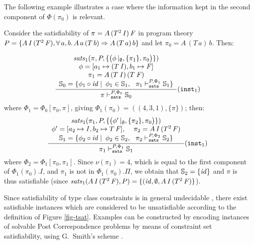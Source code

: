 The following example illustrates a case where the information kept in
the second component of $\Phi(\pi_0)$ is relevant.

\begin{Example}
\label{Paterson-condition-failure-example}
{\rm Consider the satisfiability of $\pi = A\,(T^2\,\text{\it I\/})\,\text{\it F\/}$ in
  program theory $P = \{ A\,\text{\it I\/}\,(T^2\,\text{\it F\/}), \forall\,a,b.\,A\,a\,(T\,b)
  \Rightarrow A\,(T\,a)\,b\}$ and let $\pi_0 = A\,(T\,a)\,b$. Then:}

\[
	\displaystyle\frac
		{\begin{array}{c}
            \textit{sats\/}_1(\pi,P,\{ \bigl( \phi\,|_\emptyset, \{ \pi_1 \}, \pi_0 \bigr) \}) \\
            \phi = [a_1\mapsto (T\,\text{\it I\/}), b_1 \mapsto \text{\it F\/}] \\ \pi_1 = A\,(T\:\text{\it I\/})\,(T\:\text{\it F\/})\\
            \mathbb{S}_0 = \{ \phi_1\circ {\it id\/} \mid \: \phi_1 \in \mathbb{S}_1,\:\:\:
                                                \pi_1 \vdash_{\texttt{sats}}^{P,\Phi_1} \mathbb{S}_1\}
         \end{array}}
		{\pi \vdash_{\texttt{sats}}^{P,\Phi_0} \mathbb{S}_0} ({\text{\tt inst}}_1)
\]
{\rm where $\Phi_1 = \Phi_0[\pi_0,\pi]$, giving $\Phi_1(\pi_0) = ((4,3,1), \{ \pi \})$; then:
\[
	\displaystyle\frac
		{\begin{array}{c}
            \textit{sats\/}_1(\pi_1,P,\{ \bigl( \phi'\,|_\emptyset, \{ \pi_2 \}, \pi_0 \bigr) \})\\
            \phi' = [a_2\mapsto \text{\tt \text{\it I\/}}, b_2 \mapsto T\,\text{\it F\/}],\,\,\,\,\,\,\, \pi_2 = A\,\text{\it I\/}\, (T^2\,\text{\it F\/})\\
            \mathbb{S}_1 = \{ \phi_2\circ {\it id\/} \mid \: \phi_2 \in \mathbb{S}_2,\:\:\:
            \pi_2 \vdash_{\texttt{sats}}^{P,\Phi_2} \mathbb{S}_2\}
         \end{array}}
		{\pi_1 \vdash_{\texttt{sats}}^{P,\Phi_1} \mathbb{S}_1} ({\text{\tt inst}}_1)
\]
where $\Phi_2 = \Phi_1[\pi_0,\pi_1]$. Since
      $\nu(\pi_1) = 4$, which is equal to the first component of $\Phi_1(\pi_0).I$,
      and
      $\pi_1$ is not in $\Phi_1(\pi_0).\Pi$, we obtain that
 $\mathbb{S}_2 = \{ {\it id\/} \}$ and $\pi$ is thus satisfiable
 (since $\textit{sats\/}_1(A\,\text{\it I\/}\,(T^2\,\text{\it F\/}),P) =
   \{ ({\it id\/}, \emptyset, A\,\text{\it I\/}\,(T^2\,\text{\it F\/})\}$). }
\end{Example}

Since satisfiability of type class constraints is in general
undecidable \cite{Smith-PhD-Thesis91}, there exist satisfiable
instances which are considered to be unsatisfiable according to the
definition of Figure \ref{fig-tsat}. Examples can be constructed by
encoding instances of solvable Post Correspondence problems by means
of constraint set satisfiability, using G.~Smith's scheme
\cite{Smith-PhD-Thesis91}.

